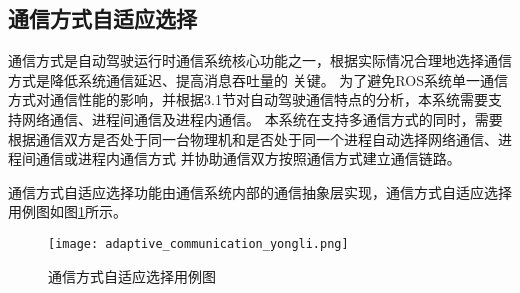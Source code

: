 \subsection{通信方式自适应选择}
通信方式是自动驾驶运行时通信系统核心功能之一，根据实际情况合理地选择通信方式是降低系统通信延迟、提高消息吞吐量的
关键。
为了避免ROS系统单一通信方式对通信性能的影响，并根据3.1节对自动驾驶通信特点的分析，本系统需要支持网络通信、进程间通信及进程内通信。
本系统在支持多通信方式的同时，需要根据通信双方是否处于同一台物理机和是否处于同一个进程自动选择网络通信、进程间通信或进程内通信方式
并协助通信双方按照通信方式建立通信链路。

通信方式自适应选择功能由通信系统内部的通信抽象层实现，通信方式自适应选择用例图如图\ref{adaptive_communication_yongli}所示。

\begin{figure}[H]
  \centering
  \texttt{[image: adaptive\_communication\_yongli.png]}
  \caption{通信方式自适应选择用例图}
  \label{adaptive_communication_yongli}
\end{figure}








